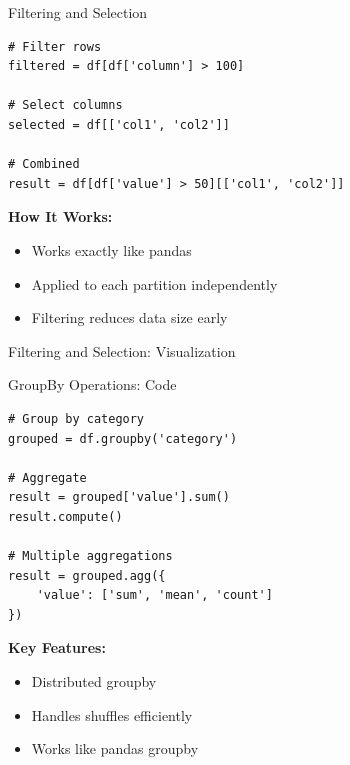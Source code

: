 \documentclass[aspectratio=169]{beamer}
\begin{document}
\begin{frame}[fragile]{Filtering and Selection}
\small
\begin{lstlisting}
# Filter rows
filtered = df[df['column'] > 100]

# Select columns
selected = df[['col1', 'col2']]

# Combined
result = df[df['value'] > 50][['col1', 'col2']]
\end{lstlisting}

\textbf{How It Works:}
\begin{itemize}
    \item Works exactly like pandas
    \item Applied to each partition independently
    \item Filtering reduces data size early
\end{itemize}
\end{frame}

\begin{frame}{Filtering and Selection: Visualization}
\small
\begin{center}
\end{center}
\end{frame}

\begin{frame}[fragile]{GroupBy Operations: Code}
\small
\begin{lstlisting}
# Group by category
grouped = df.groupby('category')

# Aggregate
result = grouped['value'].sum()
result.compute()

# Multiple aggregations
result = grouped.agg({
    'value': ['sum', 'mean', 'count']
})
\end{lstlisting}

\textbf{Key Features:}
\begin{itemize}
    \item Distributed groupby
    \item Handles shuffles efficiently
    \item Works like pandas groupby
\end{itemize}
\end{frame}
\end{document}
